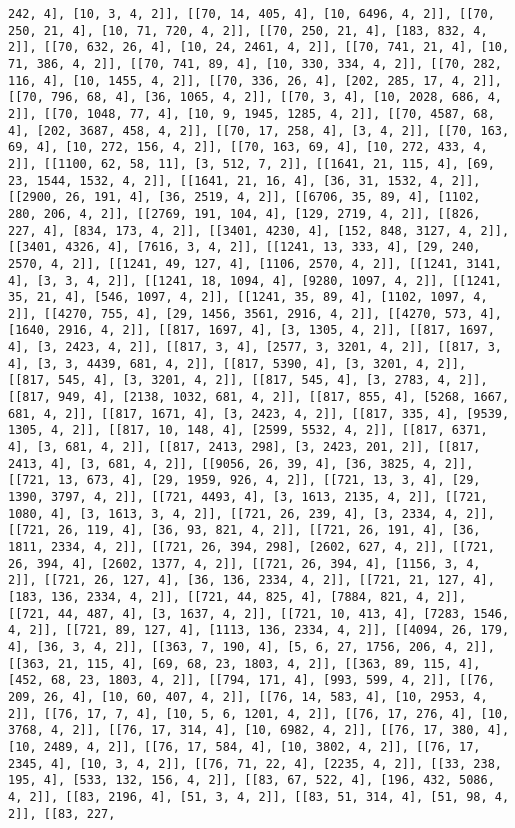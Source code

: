 \documentclass[12pt,fleqn]{article}\usepackage{../../common}
\begin{document}
\begin{verbatim}
242, 4], [10, 3, 4, 2]], [[70, 14, 405, 4], [10, 6496, 4, 2]], [[70, 250, 21, 4], [10, 71, 720, 4, 2]], [[70, 250, 21, 4], [183, 832, 4, 2]], [[70, 632, 26, 4], [10, 24, 2461, 4, 2]], [[70, 741, 21, 4], [10, 71, 386, 4, 2]], [[70, 741, 89, 4], [10, 330, 334, 4, 2]], [[70, 282, 116, 4], [10, 1455, 4, 2]], [[70, 336, 26, 4], [202, 285, 17, 4, 2]], [[70, 796, 68, 4], [36, 1065, 4, 2]], [[70, 3, 4], [10, 2028, 686, 4, 2]], [[70, 1048, 77, 4], [10, 9, 1945, 1285, 4, 2]], [[70, 4587, 68, 4], [202, 3687, 458, 4, 2]], [[70, 17, 258, 4], [3, 4, 2]], [[70, 163, 69, 4], [10, 272, 156, 4, 2]], [[70, 163, 69, 4], [10, 272, 433, 4, 2]], [[1100, 62, 58, 11], [3, 512, 7, 2]], [[1641, 21, 115, 4], [69, 23, 1544, 1532, 4, 2]], [[1641, 21, 16, 4], [36, 31, 1532, 4, 2]], [[2900, 26, 191, 4], [36, 2519, 4, 2]], [[6706, 35, 89, 4], [1102, 280, 206, 4, 2]], [[2769, 191, 104, 4], [129, 2719, 4, 2]], [[826, 227, 4], [834, 173, 4, 2]], [[3401, 4230, 4], [152, 848, 3127, 4, 2]], [[3401, 4326, 4], [7616, 3, 4, 2]], [[1241, 13, 333, 4], [29, 240, 2570, 4, 2]], [[1241, 49, 127, 4], [1106, 2570, 4, 2]], [[1241, 3141, 4], [3, 3, 4, 2]], [[1241, 18, 1094, 4], [9280, 1097, 4, 2]], [[1241, 35, 21, 4], [546, 1097, 4, 2]], [[1241, 35, 89, 4], [1102, 1097, 4, 2]], [[4270, 755, 4], [29, 1456, 3561, 2916, 4, 2]], [[4270, 573, 4], [1640, 2916, 4, 2]], [[817, 1697, 4], [3, 1305, 4, 2]], [[817, 1697, 4], [3, 2423, 4, 2]], [[817, 3, 4], [2577, 3, 3201, 4, 2]], [[817, 3, 4], [3, 3, 4439, 681, 4, 2]], [[817, 5390, 4], [3, 3201, 4, 2]], [[817, 545, 4], [3, 3201, 4, 2]], [[817, 545, 4], [3, 2783, 4, 2]], [[817, 949, 4], [2138, 1032, 681, 4, 2]], [[817, 855, 4], [5268, 1667, 681, 4, 2]], [[817, 1671, 4], [3, 2423, 4, 2]], [[817, 335, 4], [9539, 1305, 4, 2]], [[817, 10, 148, 4], [2599, 5532, 4, 2]], [[817, 6371, 4], [3, 681, 4, 2]], [[817, 2413, 298], [3, 2423, 201, 2]], [[817, 2413, 4], [3, 681, 4, 2]], [[9056, 26, 39, 4], [36, 3825, 4, 2]], [[721, 13, 673, 4], [29, 1959, 926, 4, 2]], [[721, 13, 3, 4], [29, 1390, 3797, 4, 2]], [[721, 4493, 4], [3, 1613, 2135, 4, 2]], [[721, 1080, 4], [3, 1613, 3, 4, 2]], [[721, 26, 239, 4], [3, 2334, 4, 2]], [[721, 26, 119, 4], [36, 93, 821, 4, 2]], [[721, 26, 191, 4], [36, 1811, 2334, 4, 2]], [[721, 26, 394, 298], [2602, 627, 4, 2]], [[721, 26, 394, 4], [2602, 1377, 4, 2]], [[721, 26, 394, 4], [1156, 3, 4, 2]], [[721, 26, 127, 4], [36, 136, 2334, 4, 2]], [[721, 21, 127, 4], [183, 136, 2334, 4, 2]], [[721, 44, 825, 4], [7884, 821, 4, 2]], [[721, 44, 487, 4], [3, 1637, 4, 2]], [[721, 10, 413, 4], [7283, 1546, 4, 2]], [[721, 89, 127, 4], [1113, 136, 2334, 4, 2]], [[4094, 26, 179, 4], [36, 3, 4, 2]], [[363, 7, 190, 4], [5, 6, 27, 1756, 206, 4, 2]], [[363, 21, 115, 4], [69, 68, 23, 1803, 4, 2]], [[363, 89, 115, 4], [452, 68, 23, 1803, 4, 2]], [[794, 171, 4], [993, 599, 4, 2]], [[76, 209, 26, 4], [10, 60, 407, 4, 2]], [[76, 14, 583, 4], [10, 2953, 4, 2]], [[76, 17, 7, 4], [10, 5, 6, 1201, 4, 2]], [[76, 17, 276, 4], [10, 3768, 4, 2]], [[76, 17, 314, 4], [10, 6982, 4, 2]], [[76, 17, 380, 4], [10, 2489, 4, 2]], [[76, 17, 584, 4], [10, 3802, 4, 2]], [[76, 17, 2345, 4], [10, 3, 4, 2]], [[76, 71, 22, 4], [2235, 4, 2]], [[33, 238, 195, 4], [533, 132, 156, 4, 2]], [[83, 67, 522, 4], [196, 432, 5086, 4, 2]], [[83, 2196, 4], [51, 3, 4, 2]], [[83, 51, 314, 4], [51, 98, 4, 2]], [[83, 227, 
\end{verbatim}
\end{document}
